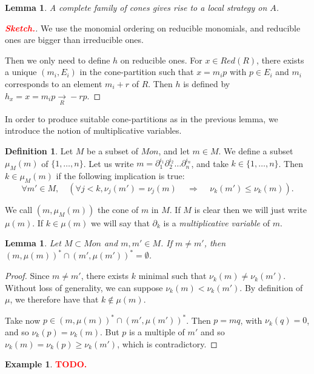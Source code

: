 \documentclass[10pt]{easychair}
\newtheorem{lemma}[theorem]{Lemma}
\theoremstyle{definition}
\newtheorem{definition}[theorem]{Definition}
\newtheorem{example}[theorem]{Example}
\newcommand\todo[1]{{\bf\textcolor{red}{#1.}}}
\newcommand\rewR{\underset{R}{\longrightarrow}}
\begin{document}
 \begin{lemma}
  A complete family of cones gives rise to a local strategy on $A$. 
\end{lemma}
\begin{proof}[\todo{Sketch}]
  We use the monomial ordering on reducible monomials, and reducible ones are bigger than irreducible ones.

  Then we only need to define $h$ on reducible ones. For $x \in Red(R)$, there exists a unique $(m_i,E_i)$ in the cone-partition such that $x=m_i p$ with $p \in E_i$ and $m_i$ corresponds to an element $m_i + r$ of $R$. Then $h$ is defined by $h_x = x = m_ip  \rewR -rp$.
\end{proof}


In order to produce suitable cone-partitions as in the previous lemma, we introduce the notion of multiplicative variables.

\begin{definition}
  Let $M$ be a subset of $Mon$, and let $m  \in M$. We define a subset $\mu_M(m)$ of $\{1,\ldots,n\}$. Let us write $m = \partial_1^{i_1}\partial_2^{i_2}\ldots \partial_n^{i_n}$, and take $k \in \{1,\ldots,n\}$. Then $k \in \mu_M(m)$ if the following implication is true:
  \[
\forall m' \in M, \quad (\forall j < k, \nu_j(m') = \nu_j(m) \, \quad \Rightarrow \quad \, \nu_k(m') \leq \nu_k(m)).
  \]
  

  We call $(m,\mu_M(m))$ the cone of $m$ in $M$. If $M$ is clear then we will just write $\mu(m)$. If $k \in \mu(m)$ we will say that $\partial_k$ is a \emph{multiplicative variable} of $m$.
\end{definition}

\begin{lemma}\label{lem:multiplicative_cones_disjoint}
Let $M \subset Mon$ and $m,m' \in M$. If $m \neq m'$, then $(m,\mu(m))^* \cap (m',\mu(m'))^* = \emptyset$.
\end{lemma}
\begin{proof}
   Since $m \neq m'$, there exists $k$ minimal such that $\nu_k(m) \neq \nu_k(m')$. Without loss of generality, we can suppose $\nu_k(m) < \nu_k(m')$. By definition of $\mu$, we therefore have that $k \notin \mu(m)$.

   Take now $p \in (m,\mu(m))^* \cap (m',\mu(m'))^*$. Then $p = mq$, with $\nu_k(q) = 0$, and so $\nu_k(p) = \nu_k(m)$. But $p$ is a multiple of $m'$ and so $\nu_k(m) = \nu_k(p) \geq \nu_k(m')$, which is contradictory.
 \end{proof}

 \begin{example}
\todo{TODO}
 \end{example}
\end{document}
